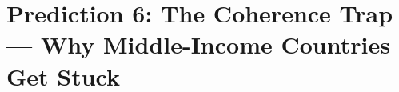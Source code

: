 \section{Prediction 6: The Coherence Trap --- Why Middle-Income Countries Get Stuck}
\label{app:prediction-coherence-trap}


\begin{abstract}
This appendix provides the complete technical foundation for Prediction 6 of the 
Complementarity-Context Framework: that middle-income countries can become trapped 
in coherent but suboptimal equilibria, where the very coherence of their current 
configuration prevents transition to higher-income status. We develop the formal 
model of coherence traps, derive the conditions for escape (simultaneous reform 
across multiple dimensions), validate against historical development trajectories, 
and explain why Korea escaped while Brazil remained stuck. The analysis reframes 
the ``middle-income trap'' as a coherence problem, not merely an institutional or 
human capital problem.
\end{abstract}


